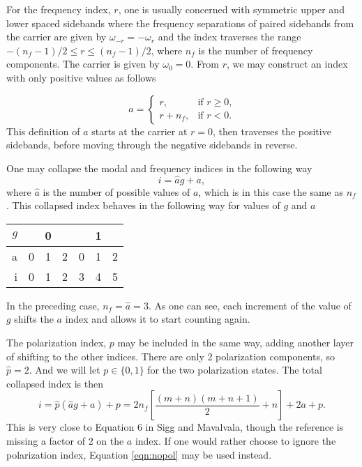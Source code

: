 For the frequency index, $r$, one is usually concerned with symmetric upper and lower spaced sidebands where the frequency separations of paired sidebands from the carrier are given by $\omega_{-r} = -\omega_{r}$ and the index traverses the range $-(n_f-1)/2\le r \le (n_f-1)/2$, where $n_f$ is the number of frequency components. %
The carrier is given by $\omega_0=0$. %
From $r$, we may construct an index with only positive values as follows

\begin{equation*}
a= 
\begin{cases} r, & \text{if $r \ge 0 $,}
\\
r+n_f, &\text{if $r < 0$.}
\end{cases}
\end{equation*}
 This definition of $a$ starts at the carrier at $r=0$, then traverses the positive sidebands, before moving through the negative sidebands in reverse.

One may collapse the modal and frequency indices in the following way
\begin{equation}
\label{eqn:nopol}
i = \hat{a}g + a,
\end{equation}
where $\hat{a}$ is the number of possible values of $a$, which is in this case the same as $n_f$. %
This collapsed index behaves in the following way for values of $g$ and $a$
\begin{center}
\begin{tabular}{ r| c c c | c c c}
$g$ & \multicolumn{3}{c|}{0} & \multicolumn{3}{c}{1} \\
\hline
a & 0 & 1 & 2 & 0 & 1 & 2 \\
\hline
i & 0 & 1 & 2 & 3 & 4 & 5
\end{tabular} 
\end{center}
In the preceding case, $n_f=\hat{a}=3$. %
As one can see, each increment of the value of $g$ shifts the $a$ index and allows it to start counting again.

The polarization index, $p$ may be included in the same way, adding another layer of shifting to the other indices. %
There are only 2 polarization components, so $\hat{p}=2$. %
And we will let $p \in \{0,1\}$ for the two polarization states. %
The total collapsed index is then
\begin{equation}
i = \hat{p}(\hat{a}g+a)+p=2n_f\left[\frac{(m+n)(m+n+1)}{2} + n\right]+2a+p.
\end{equation}
This is very close to Equation 6 in Sigg and Mavalvala, though the reference is missing a factor of 2 on the $a$ index. %
If one would rather choose to ignore the polarization index, Equation \ref{eqn:nopol} may be used instead.

